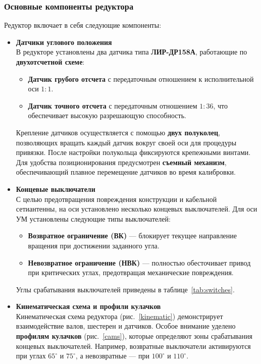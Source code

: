 \subsubsection{Основные компоненты редуктора}
Редуктор включает в себя следующие компоненты:
\begin{itemize}
    \item \textbf{Датчики углового положения} \\
    В редукторе установлены два датчика типа \textbf{ЛИР-ДР158А}, работающие по \textbf{двухотсчетной схеме}:
    \begin{itemize}
        \item \textbf{Датчик грубого отсчета} с передаточным отношением к исполнительной оси \(1:1\).
        \item \textbf{Датчик точного отсчета} с передаточным отношением \(1:36\), что обеспечивает высокую разрешающую способность.
    \end{itemize}
    Крепление датчиков осуществляется с помощью \textbf{двух полуколец}, позволяющих вращать каждый датчик вокруг своей оси для процедуры привязки. %
    После настройки полукольца фиксируются крепежными винтами. Для удобства позиционирования предусмотрен \textbf{съемный механизм}, 
    обеспечивающий плавное перемещение датчиков во время калибровки.

    \item \textbf{Концевые выключатели} \\
    С целью предотвращения повреждения конструкции и кабельной сетиантенны, на оси установлено несколько концевых выключателей. 
    Для оси УМ установлены следующие типы выключателей:
    \begin{itemize}
        \item \textbf{Возвратное ограничение (ВК)} — блокирует текущее направление вращения при достижении заданного угла.
        \item \textbf{Невозвратное ограничение (НВК)} — полностью обесточивает привод при критических углах, предотвращая механические повреждения.
    \end{itemize}
    Углы срабатывания выключателей приведены в таблице~\ref{tab:switches}.

    \item \textbf{Кинематическая схема и профили кулачков} \\
    Кинематическая схема редуктора (рис.~\ref{kinematic}) демонстрирует взаимодействие валов, шестерен и датчиков. Особое внимание уделено \textbf{профилям кулачков} (рис.~\ref{cams}), 
    которые определяют зоны срабатывания концевых выключателей. 
    Например, возвратные выключатели активируются при углах \(65^\circ\) и \(75^\circ\), а невозвратные — при \(100^\circ\) и \(110^\circ\).
\end{itemize}

